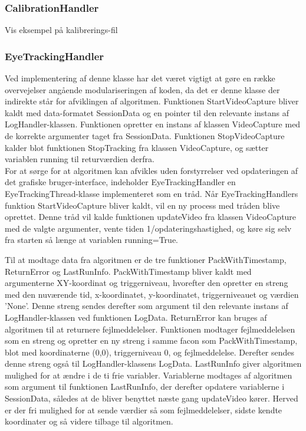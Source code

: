 \documentclass[rapport.tex]{subfiles}
\begin{document}
	\subsubsection{CalibrationHandler}
	Vis eksempel på kalibrerings-fil
	
	\subsubsection{EyeTrackingHandler}
	Ved implementering af denne klasse har det været vigtigt at gøre en række overvejelser angående modulariseringen af koden, da det er denne klasse der indirekte står for afviklingen af algoritmen. Funktionen StartVideoCapture bliver kaldt med data-formatet SessionData og en pointer til den relevante instans af LogHandler-klassen. Funktionen opretter en instans af klassen VideoCapture med de korrekte argumenter taget fra SessionData.
	Funktionen StopVideoCapture kalder blot funktionen StopTracking fra klassen VideoCapture, og sætter variablen running til returværdien derfra.\\
	 
	For at sørge for at algoritmen kan afvikles uden forstyrrelser ved opdateringen af det grafiske bruger-interface, indeholder EyeTrackingHandler en EyeTrackingThread-klasse implementeret som en tråd. Når EyeTrackingHandlers funktion StartVideoCapture bliver kaldt, vil en ny process med tråden blive oprettet. Denne tråd vil kalde funktionen updateVideo fra klassen VideoCapture med de valgte argumenter, vente tiden 1/opdateringshastighed, og køre sig selv fra starten så længe at variablen running=True.
	
	Til at modtage data fra algoritmen er de tre funktioner PackWithTimestamp, ReturnError og LastRunInfo. PackWithTimestamp bliver kaldt med argumenterne XY-koordinat og triggerniveau, hvorefter den opretter en streng med den nuværende tid, x-koordinatet, y-koordinatet, triggerniveauet og værdien 'None'. Denne streng sendes derefter som argument til den relevante instans af LogHandler-klassen ved funktionen LogData. ReturnError kan bruges af algoritmen til at returnere fejlmeddelelser. Funktionen modtager fejlmeddelelsen som en streng og opretter en ny streng i samme facon som PackWithTimestamp, blot med koordinaterne (0,0), triggerniveau 0, og fejlmeddelelse. Derefter sendes denne streng også til LogHandler-klassens LogData. LastRunInfo giver algoritmen mulighed for at ændre i de ti frie variabler. Variablerne modtages af algoritmen som argument til funktionen LastRunInfo, der derefter opdatere variablerne i SessionData, således at de bliver benyttet næste gang updateVideo kører. Herved er der fri mulighed for at sende værdier så som fejlmeddelelser, sidste kendte koordinater og så videre tilbage til algoritmen. 
	
\end{document}
